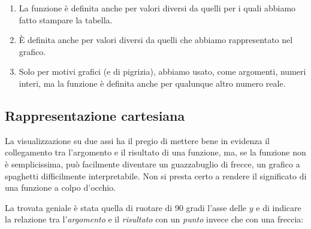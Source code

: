 \begin{osservazione}
\begin{enumerate} [nosep]
\item La funzione è definita anche per valori diversi da quelli per i quali 
abbiamo fatto stampare la tabella.
\item È definita anche per valori diversi da quelli che abbiamo 
rappresentato nel grafico.
\item Solo per motivi grafici (e di pigrizia), abbiamo usato, come argomenti, 
numeri interi, ma la funzione è definita anche per qualunque altro numero 
reale.
\end{enumerate}
\end{osservazione}

\subsection{Rappresentazione cartesiana}
\label{sec:funzioni2_rcartesiana}

La visualizzazione su due assi ha il pregio di mettere bene in evidenza il 
collegamento tra l'argomento e il risultato di una funzione, ma, se la 
funzione non è semplicissima, può facilmente diventare un guazzabuglio di 
frecce, un grafico a spaghetti difficilmente interpretabile. Non si presta 
certo a rendere il significato di una funzione a colpo d'occhio.

La trovata geniale è stata quella di ruotare di 90 gradi l'asse delle \(y\) e 
di indicare la relazione tra l'\emph{argomento} e il \emph{risultato} con 
un \emph{punto} invece che con una freccia:

\vspace{1em}
